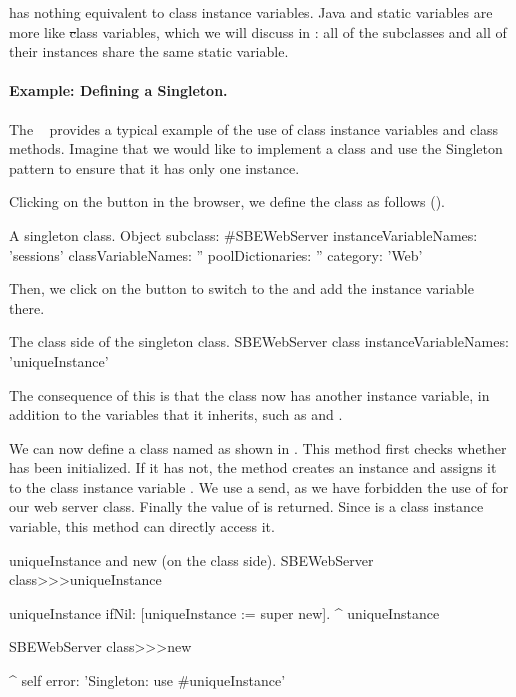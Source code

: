 \documentclass[a4paper,10pt,twoside]{book}
\begin{document}
 has nothing equivalent to class instance variables.
Java and  static variables are more like \st class variables, which we will discuss in : all of the subclasses and all of their instances share the same static variable.

\paragraph{Example: Defining a Singleton.}
The ~\cite{Alpe98a} provides a typical example of the use of class instance variables and class methods.
Imagine that we would like to implement a class  and use the Singleton pattern to ensure that it has only one instance.

Clicking on the  button in the browser, we define the class  as follows ().

\begin{classdef}[singleton]{A singleton class.}
Object subclass: #SBEWebServer
	instanceVariableNames: 'sessions'
	classVariableNames: ''
	poolDictionaries: ''
	category: 'Web'
\end{classdef}

Then, we click on the  button to switch to the  and add the instance variable  there.

\begin{classdef}[sbewebserver]{The class side of the singleton class.}
SBEWebServer class
	instanceVariableNames: 'uniqueInstance'
\end{classdef}

The consequence of this is that the class  now has another instance variable, in addition to the variables that it inherits, such as  and .

We can now define a class  named  as shown in .
This method first checks whether  has been initialized.
If it has not, the method creates an instance and assigns it to the class instance variable .
We use a  send, as we have forbidden the use of  for our web server class.
Finally the value of  is returned.
Since  is a class instance variable, this method can directly access it.

\begin{method}[uniqueInstance]{uniqueInstance and new (on the class side).}
SBEWebServer class>>>uniqueInstance

     uniqueInstance ifNil: [uniqueInstance := super new].
     ^ uniqueInstance


SBEWebServer class>>>new

	^ self error: 'Singleton: use #uniqueInstance'
\end{method}
\end{document}
